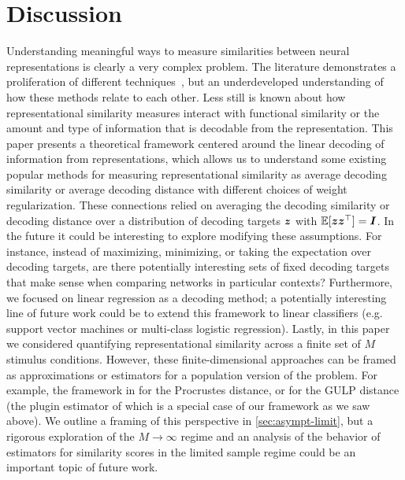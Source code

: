 \section{Discussion}

Understanding meaningful ways to measure similarities between neural representations  is clearly a very complex problem.  
The literature demonstrates a proliferation of different techniques~\cite{klabunde2023similarity, sucholutsky2023getting}, but an underdeveloped understanding of how these methods relate to each other. 
Less still is known about how representational similarity measures interact with functional similarity or the amount and type of information that is decodable from the representation. 
This paper presents a theoretical framework centered around the linear decoding of information from representations, which allows us to understand some existing popular methods for measuring representational similarity as average decoding similarity or average decoding distance with different choices of weight regularization.
These connections relied on averaging the decoding similarity or decoding distance over a distribution of decoding targets $\boldsymbol{z}$ with $\mathbb{E}[\boldsymbol{z} \boldsymbol{z}^\top] = \boldsymbol{I}$.
In the future it could be interesting to explore modifying these assumptions.  
For instance, instead of maximizing, minimizing, or taking the expectation over decoding targets, are there potentially interesting sets of fixed decoding targets that make sense when comparing networks in particular contexts? 
Furthermore, we focused on linear regression as a decoding method; a potentially interesting line of future work could be to extend this framework to linear classifiers (e.g. support vector machines or multi-class logistic regression).
Lastly, in this paper we considered quantifying representational similarity across a finite set of $M$ stimulus conditions.  
However, these finite-dimensional approaches can be framed as approximations or estimators for a population version of the problem. 
For example, the framework in \cite{pospisil2024estimating} for the Procrustes distance, or \cite{BoixAdsera2022} for the GULP distance (the plugin estimator of which is a special case of our framework as we saw above).
We outline a framing of this perspective in \cref{sec:asympt-limit}, but a rigorous exploration of the $M \rightarrow \infty$ regime and an analysis of the behavior of estimators for similarity scores in the limited sample regime could be an important topic of future work.   
